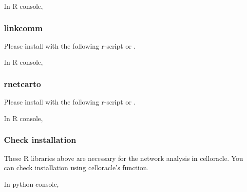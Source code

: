 \documentclass[letterpaper,10pt,english]{sphinxmanual}
\begin{document}
In R console,

\begin{sphinxVerbatim}[commandchars=\\\{\}]
\end{sphinxVerbatim}


\subsubsection{linkcomm}
\label{\detokenize{installation/index:id9}}
Please install  with the following r-script or  .

In R console,

\begin{sphinxVerbatim}[commandchars=\\\{\}]
\end{sphinxVerbatim}


\subsubsection{rnetcarto}
\label{\detokenize{installation/index:id11}}
Please install  with the following r-script or  .

In R console,

\begin{sphinxVerbatim}[commandchars=\\\{\}]
\end{sphinxVerbatim}


\subsubsection{Check installation}
\label{\detokenize{installation/index:check-installation}}
These R libraries above are necessary for the network analysis in celloracle. You can check installation using celloracle’s function.

In python console,

\begin{sphinxVerbatim}[commandchars=\\\{\}]
   
\end{sphinxVerbatim}
\end{document}
